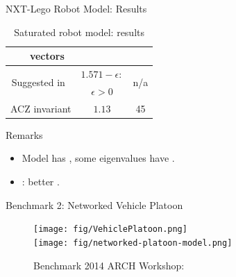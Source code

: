 \begin{frame}{NXT-Lego Robot Model: Results}
{\begin{minipage}{0.48\textwidth}
\begin{table}
{\begin{tabular}{|l|c|c|c|}
& vectors & & \\
\hline
\multicolumn{2}{|c|}{\multirow{2}{*}{Suggested in~\cite{heinz2014benchmark}}} &
$1.571-\epsilon:$ & \multirow{2}{*}{n/a}\\
\multicolumn{2}{|c|}{} & $\epsilon>0$ &\\
\hline
\multicolumn{2}{|c|}{\multirow{2}{*}{ACZ invariant}} & \multirow{2}{*}{$1.13$} &
\multirow{2}{*}{45}\\
\multicolumn{2}{|c|}{} & &\\
\hline
\end{tabular}
}
\caption*{{\footnotesize Saturated robot model: results}}
\end{table}
\end{minipage}
}
\vspace{-2em}
{\small
\begin{alertblock}{Remarks}
\begin{itemize}
\item Model has , some eigenvalues have .
\item {}: better .
\end{itemize}
\end{alertblock}
}
\end{frame}


\begin{frame}{Benchmark 2: Networked Vehicle Platoon}
\begin{figure}
\caption*{\small Benchmark {\color{blue}  2014 ARCH Workshop}: }
\texttt{[image: fig/VehiclePlatoon.png]}\\
\texttt{[image: fig/networked-platoon-model.png]}
\end{figure}
\end{frame}


